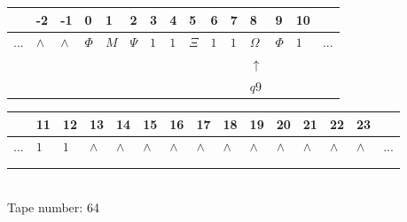 \documentclass[11pt]{article}
\begin{document}
\begin{table}[H]
\centering
\begin{tabular}{lllllllllllllll}
 & -2 & -1 & 0 & 1 & 2 & 3 & 4 & 5 & 6 & 7 & 8 & 9 & 10 & \\
\hline
$...$ & \multicolumn{1}{|l|}{$\wedge$} & \multicolumn{1}{|l|}{$\wedge$} & \multicolumn{1}{|l|}{$\Phi$} & \multicolumn{1}{|l|}{$M$} & \multicolumn{1}{|l|}{$\Psi$} & \multicolumn{1}{|l|}{$1$} & \multicolumn{1}{|l|}{$1$} & \multicolumn{1}{|l|}{$\Xi$} & \multicolumn{1}{|l|}{$1$} & \multicolumn{1}{|l|}{$1$} & \multicolumn{1}{|l|}{$\Omega$} & \multicolumn{1}{|l|}{$\Phi$} & \multicolumn{1}{|l|}{$1$} & $...$\\
\hline
&  &  &  &  &  &  &  &  &  &  & $\uparrow$ &  &  &  \\
&  &  &  &  &  &  &  &  &  &  & $ q9 $ &  &  &  \\
\end{tabular}
\begin{tabular}{lllllllllllllll}
 & 11 & 12 & 13 & 14 & 15 & 16 & 17 & 18 & 19 & 20 & 21 & 22 & 23 & \\
\hline
$...$ & \multicolumn{1}{|l|}{$1$} & \multicolumn{1}{|l|}{$1$} & \multicolumn{1}{|l|}{$\wedge$} & \multicolumn{1}{|l|}{$\wedge$} & \multicolumn{1}{|l|}{$\wedge$} & \multicolumn{1}{|l|}{$\wedge$} & \multicolumn{1}{|l|}{$\wedge$} & \multicolumn{1}{|l|}{$\wedge$} & \multicolumn{1}{|l|}{$\wedge$} & \multicolumn{1}{|l|}{$\wedge$} & \multicolumn{1}{|l|}{$\wedge$} & \multicolumn{1}{|l|}{$\wedge$} & \multicolumn{1}{|l|}{$\wedge$} & $...$\\
\hline
&  &  &  &  &  &  &  &  &  &  &  &  &  &  \\
&  &  &  &  &  &  &  &  &  &  &  &  &  &  \\
\end{tabular}
\\
Tape number: 64
\noindent\makebox[\linewidth]{\hdashrule{\textwidth}{1pt}{1pt}}\end{table}
\end{document}
